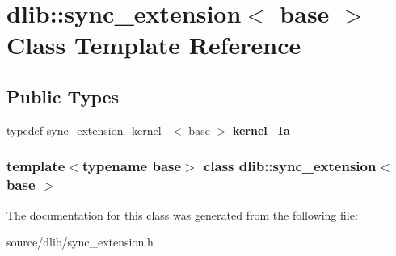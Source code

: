 \hypertarget{classdlib_1_1sync__extension}{
\section{dlib::sync\_\-extension$<$ base $>$ Class Template Reference}
\label{classdlib_1_1sync__extension}
}
\subsection*{Public Types}
\begin{DoxyCompactItemize}
\item 
\hypertarget{classdlib_1_1sync__extension_a07150c2d9d9d3929fa042bfcdd14078f}{
typedef sync\_\-extension\_\-kernel\_$<$ base $>$ {\bfseries kernel\_\-1a}}
\label{classdlib_1_1sync__extension_a07150c2d9d9d3929fa042bfcdd14078f}

\end{DoxyCompactItemize}
\subsubsection*{template$<$typename base$>$ class dlib::sync\_\-extension$<$ base $>$}



The documentation for this class was generated from the following file:\begin{DoxyCompactItemize}
\item 
source/dlib/sync\_\-extension.h\end{DoxyCompactItemize}
